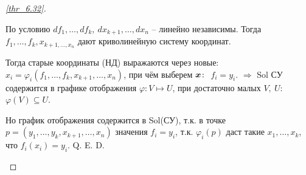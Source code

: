 \begin{proof}[\ref{thr_6.32}]   

\begin{enumerate*}
    \item По условию $df_1, \ldots, df_k, \ dx_{k+1}, \ldots, dx_n$ -- линейно независимы. Тогда $f_1, \ldots, f_k, x_{k+1, \ldots, x_n}$ дают криволинейную систему координат. 
    \item Тогда старые координаты (НД) выражаются через новые: $x_i = \varphi_i(f_1, \ldots, f_k, x_{k+1}, \ldots, x_n)$, при чём выберем $\mbox{\boldmath $x$}\colon$ $f_i = y_i$. $\Rightarrow$ Sol СУ содержится в графике отображения $\varphi \colon V \mapsto  U$, при достаточно малых $V, \ U$: $\varphi(V) \subseteq U$. 
    \item Но график отображения содержится в Sol(СУ), т.к. в точке $p = (y_1, \ldots, y_k, x_{k+1},\ldots,x_n)$ значения $f_i = y_i$, т.к. $\varphi_i (p)$ даст такие $x_1, \ldots, x_k$, что $f_i(x_i)=y_i$. Q. E. D.
\end{enumerate*}
    
\end{proof}
